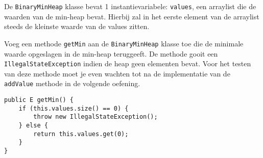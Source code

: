\begin{oef}
\code De \verb=BinaryMinHeap= klasse bevat 1 instantievariabele: \verb=values=, een arraylist die de waarden van de min-heap bevat. Hierbij zal in het eerste element van de arraylist steeds de kleinste waarde van de values zitten.

Voeg een methode \verb=getMin= aan de \verb=BinaryMinHeap= klasse toe die de minimale waarde opgeslagen in de min-heap teruggeeft.	De methode gooit een \verb+IllegalStateException+ indien de heap geen elementen bevat. Voor het testen van deze methode moet je even wachten tot na de implementatie van de \verb+addValue+ methode in de volgende oefening.
\begin{opl}
\begin{lstlisting}[caption={kleinste waarde van min-heap}, label=minheapkleinste]
public E getMin() {
	if (this.values.size() == 0) {
		throw new IllegalStateException();
	} else {
		return this.values.get(0);
	}
}
\end{lstlisting}

\end{opl}

\end{oef}


